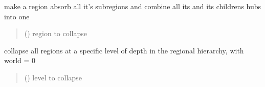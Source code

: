 \documentclass[letterpaper,10pt,english]{sphinxmanual}
\begin{document}
\begin{fulllineitems}
\begin{fulllineitems}
\end{fulllineitems}


\begin{fulllineitems}
\label{\detokenize{src.models.hydrogen.network.grid:src.models.hydrogen.network.grid.Grid.collapse}}
\pysigstartsignatures
\pysiglinewithargsret
{}
{}
{}
\pysigstopsignatures
\sphinxAtStartPar
make a region absorb all it’s sub\sphinxhyphen{}regions and combine all its and its childrens hubs into one
\begin{quote}\begin{description}
\sphinxAtStartPar
{} () \textendash{} region to collapse

\end{description}\end{quote}

\end{fulllineitems}


\begin{fulllineitems}
\label{\detokenize{src.models.hydrogen.network.grid:src.models.hydrogen.network.grid.Grid.collapse_level}}
\pysigstartsignatures
\pysiglinewithargsret
{}
{}
{}
\pysigstopsignatures
\sphinxAtStartPar
collapse all regions at a specific level of depth in the regional hierarchy, with world = 0
\begin{quote}\begin{description}
\sphinxAtStartPar
{} () \textendash{} level to collapse

\end{description}\end{quote}

\end{fulllineitems}



\end{fulllineitems}
\end{document}
